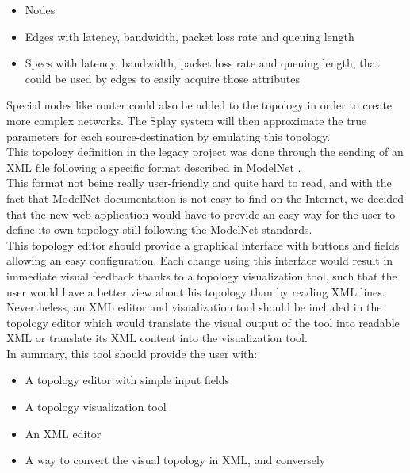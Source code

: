 \documentclass{eplmastersthesis}
\begin{document}
          \begin{itemize}
            \item Nodes
            \item Edges with latency, bandwidth, packet loss rate and queuing
            length
            \item Specs with latency, bandwidth, packet loss rate and queuing
            length, that could be used by edges to easily acquire those
            attributes
          \end{itemize}

          Special nodes like router could also be added to the topology in order
          to create more complex networks. The Splay system will then
          approximate the true parameters for each source-destination by
          emulating this topology.\\

          This topology definition in the legacy project was done through
          the sending of an XML file following a specific format described
          in ModelNet \cite{ModelNet}.\\
          This format not being really user-friendly and quite hard to read,
          and with the fact that ModelNet documentation is not easy to find
          on the Internet, we decided that the new web application would have
          to provide an easy way for the user to define its own topology
          still following the ModelNet standards.\\

          This topology editor should provide a graphical interface with
          buttons and fields allowing an easy configuration. Each change
          using this interface would result in immediate visual feedback
          thanks to a topology visualization tool, such that the user would
          have a better view about his topology than by reading XML lines.
          Nevertheless, an XML editor and visualization tool should be included
          in the topology editor which would translate the visual output of
          the tool into readable XML or translate its XML content into the
          visualization tool.\\

          In summary, this tool should provide the user with:

          \begin{itemize}
            \item A topology editor with simple input fields
            \item A topology visualization tool
            \item An XML editor
            \item A way to convert the visual topology in XML, and conversely
          \end{itemize}
\end{document}
